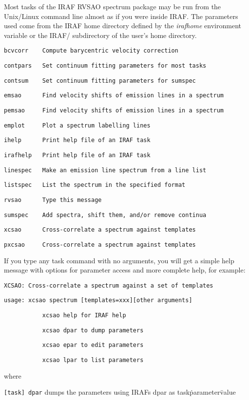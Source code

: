 \documentclass[11pt,twoside]{article}
\begin{document}
Most tasks of the IRAF RVSAO spectrum package may be run from the Unix/Linux
command line almost as if you were inside IRAF. The parameters used come from the IRAF
home directory defined by the \textit{irafhome} environment variable or
the IRAF/ subdirectory of the user's home directory.

\texttt{bcvcorr~~~~Compute barycentric velocity correction}

\texttt{contpars~~~Set continuum fitting parameters for most tasks}

\texttt{contsum~~~~Set continuum fitting parameters for sumspec}

\texttt{emsao~~~~~~Find velocity shifts of emission lines in a spectrum}

\texttt{pemsao~~~~~Find velocity shifts of emission lines in a spectrum}

\texttt{emplot~~~~~Plot a spectrum labelling lines}

\texttt{ihelp~~~~~~Print help file of an IRAF task}

\texttt{irafhelp~~~Print help file of an IRAF task}

\texttt{linespec~~~Make an emission line spectrum from a line list}

\texttt{listspec~~~List the spectrum in the specified format}

\texttt{rvsao~~~~~~Type this message}

\texttt{sumspec~~~~Add spectra, shift them, and/or remove continua}

\texttt{xcsao~~~~~~Cross-correlate a spectrum against templates}

\texttt{pxcsao~~~~~Cross-correlate a spectrum against templates}

If you type any task command with no arguments, you will get a simple help
message with options for parameter access and more complete help,
for example:

\texttt{XCSAO: Cross-correlate a spectrum against a set of templates}

\texttt{usage: xcsao spectrum [templates=xxx][other arguments]}

\texttt{~~~~~~~~~~~xcsao help for IRAF help}

\texttt{~~~~~~~~~~~xcsao dpar to dump parameters}

\texttt{~~~~~~~~~~~xcsao epar to edit parameters}

\texttt{~~~~~~~~~~~xcsao lpar to list parameters}

where

\texttt{[task] dpar} dumps the parameters using IRAFs dpar as task\.parameter\=value
\end{document}
